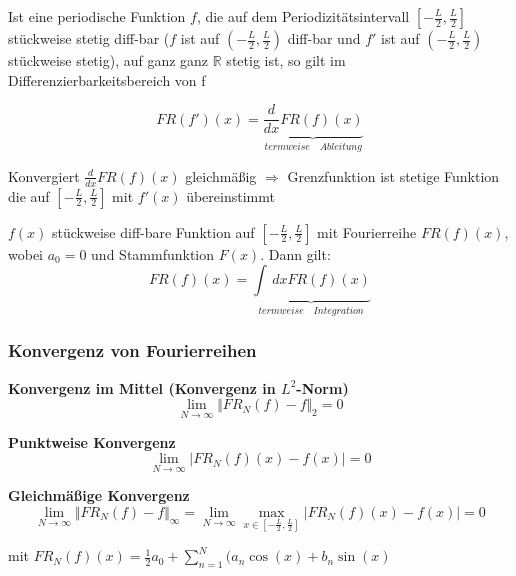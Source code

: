 \begin{Satz}
	Ist eine periodische Funktion $f$, die auf dem Periodizitätsintervall
	$[-\frac{L}{2}, \frac{L}{2}]$ stückweise stetig diff-bar ($f$ ist auf
	$(-\frac{L}{2}, \frac{L}{2})$ diff-bar und $f'$ ist auf $(-\frac{L}{2}, \frac{L}{2})$
	stückweise stetig), auf ganz ganz $\mathbb{R}$ stetig ist, so gilt im
	Differenzierbarkeitsbereich von f

	$$FR(f')(x) = \underbrace{\frac{d}{dx}FR(f)(x)}_{termweise \quad Ableitung}$$

\end{Satz}

\begin{Bem}
	Konvergiert $\frac{d}{dx} FR(f)(x)$ gleichmäßig $\Rightarrow$
	Grenzfunktion ist stetige Funktion die auf $[-\frac{L}{2}, \frac{L}{2}]$
	mit $f'(x)$ übereinstimmt
\end{Bem}

\begin{Satz}
	$f(x)$ stückweise diff-bare Funktion auf $[-\frac{L}{2}, \frac{L}{2}]$ mit
	Fourierreihe $FR(f)(x)$, wobei $a_0 = 0$ und Stammfunktion $F(x)$.
	Dann gilt:
	$$FR(f)(x) = \underbrace{\int \,dx FR(f)(x)}_{termweise \quad Integration} $$
\end{Satz}

\subsubsection{Konvergenz von Fourierreihen}
\textbf{Konvergenz im Mittel (Konvergenz in $L^2$-Norm)}
$$\lim_{N \rightarrow \infty} \Vert FR_N(f)-f \Vert_2 = 0$$

\textbf{Punktweise Konvergenz}
$$\lim_{N \rightarrow \infty} \vert FR_N(f)(x)-f(x) \vert = 0$$

\textbf{Gleichmäßige Konvergenz}
$$\lim_{N \rightarrow \infty} \Vert FR_N(f)-f \Vert_\infty = \lim_{N \rightarrow \infty} 
\max_{x \in [-\frac{L}{2} , \frac{L}{2}]} \vert FR_N(f)(x)-f(x) \vert = 0$$

mit $FR_N(f)(x) = \frac{1}{2} a_0 + \sum_{n=1}^N(a_n \cos(x) + b_n \sin(x)$







